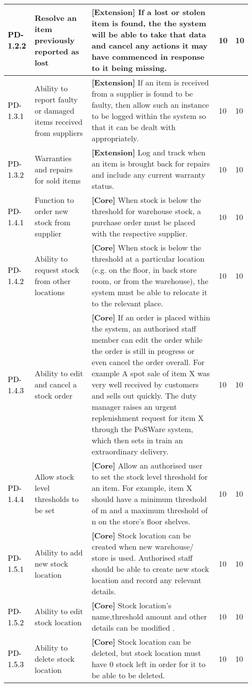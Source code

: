 \documentclass[a4paper]{article}
\begin{document}
\begin{longtable}{|l|p{5cm}|p{7cm}|p{0.5cm}|p{0.5cm}|}
\textcolor{black}{PD-1.2.2} & Resolve an item previously reported as lost & \textbf{[Extension] }If a lost or stolen item is found, the the system will be able to take that data and cancel any actions it may have commenced in response to it being missing.& 10 & 10\\
\hline
\textcolor{black}{PD-1.3.1} & Ability to report faulty or damaged items received from suppliers & \textbf{[Extension] }If an item is received from a supplier is found to be faulty, then allow such an instance to be logged within the system so that it can be dealt with appropriately.& 10 & 10\\
\textcolor{black}{PD-1.3.2} & Warranties and repairs for sold items & \textbf{[Extension] }Log and track when an item is brought back for repairs and include any current warranty status.& 10 & 10\\
\hline
\textcolor{black}{PD-1.4.1} & Function to order new stock from supplier & \textbf{[Core] }When stock is below the threshold for warehouse stock, a purchase order must be placed with the respective supplier.& 10 & 10\\
\textcolor{black}{PD-1.4.2} & Ability to request stock from other locations & \textbf{[Core] }When stock is below the threshold at a particular location (e.g. on the floor, in back store room, or from the warehouse), the system must be able to relocate it to the relevant place.& 10 & 10\\
\textcolor{black}{PD-1.4.3} & Ability to edit and cancel a stock order & \textbf{[Core] }If an order is placed within the system, an authorised staff member can edit the order while the order is still in progress or even cancel the order overall. For example A spot sale of item X was very well received by customers and sells out quickly. The duty manager raises an urgent replenishment request for item X through the PoSWare system, which then sets in train an extraordinary delivery.& 10 & 10\\
\textcolor{black}{PD-1.4.4} & Allow stock level thresholds to be set & \textbf{[Core] }Allow an authorised user to set the stock level threshold for an item. For example, item X should have a minimum threshold of m and a maximum threshold of n on the store's floor shelves.& 10 & 10\\
\hline
\textcolor{black}{PD-1.5.1} & Ability to add new stock location & \textbf{[Core] }Stock location can be created when new warehouse/ store is used. Authorised staff should be able to create new stock location and record any relevant details.& 10 & 10\\
\textcolor{black}{PD-1.5.2} & Ability to edit stock location & \textbf{[Core] }Stock location's name,threshold amount and other details can be modified .& 10 & 10\\
\textcolor{black}{PD-1.5.3} & Ability to delete stock location & \textbf{[Core] }Stock location can be deleted, but stock location must have 0 stock left in order for it to be able to be deleted.& 10 & 10\\


\end{longtable}
\end{document}

